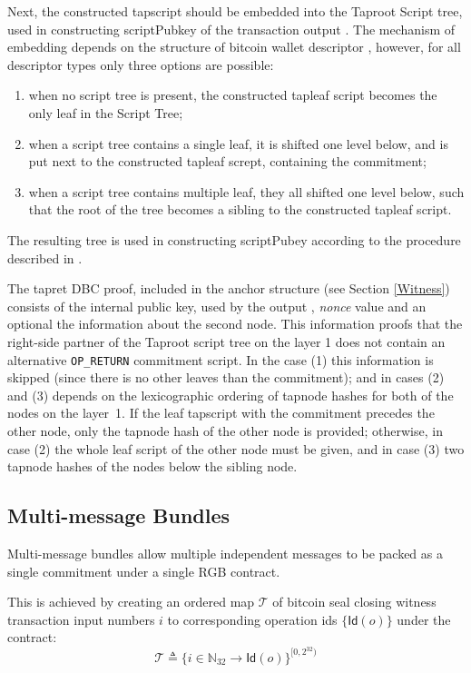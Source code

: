 \documentclass[9pt,oneside]{amsart}
\begin{document}
\begin{multicols}{2}
Next, the constructed tapscript should be embedded into the Taproot Script tree,
used in constructing \textsf{scriptPubkey} of the transaction output \cite{BIP341}.
The mechanism of embedding depends on the structure of bitcoin wallet descriptor \cite{BIP380},
however, for all descriptor types only three options are possible:
\noindent
\begin{enumerate}
\item when no script tree is present,
    the constructed tapleaf script becomes the only leaf in the Script Tree;
\item when a script tree contains a single leaf, it is shifted one level below,
    and is put next to the constructed tapleaf scrept, containing the commitment;
\item when a script tree contains multiple leaf, they all shifted one level below,
    such that the root of the tree becomes a sibling to the constructed tapleaf script.
\end{enumerate}
\noindent
The resulting tree is used in constructing \textsf{scriptPubey}
according to the procedure described in \cite{BIP341}.

The tapret DBC proof, included in the anchor structure (see Section \ref{Witness})
consists of the internal public key, used by the output \cite{BIP341},
\emph{nonce} value and an optional the information about the second node.
This information proofs that the right-side partner of the Taproot script tree on the layer 1
does not contain an alternative \verb|OP_RETURN| commitment script.
In the case (1) this information is skipped (since there is no other leaves than the commitment);
and in cases (2) and (3) depends on the lexicographic ordering
of tapnode hashes \cite{BIP341} for both of the nodes on the layer~1.
If the leaf tapscript with the commitment precedes the other node,
only the tapnode hash of the other node is provided;
otherwise, in case (2) the whole leaf script of the other node must be given,
and in case (3) two tapnode hashes of the nodes below the sibling node.


\subsection{Multi-message Bundles}\label{MMB}

Multi-message bundles allow multiple independent messages
to be packed as a single commitment under a single RGB contract.

This is achieved by creating an ordered map $\mathcal{T}$ of
bitcoin seal closing witness transaction input numbers $i$
to corresponding operation ids $\{ \mathsf{Id}(o) \}$ under the contract:
\noindent
\begin{equation}
    \mathcal{T} \triangleq \{ i \in \mathbb{N}_{32} \rightarrow \mathsf{Id}(o) \}^{[0, 2^{32})}
\end{equation}


\end{multicols}
\end{document}
